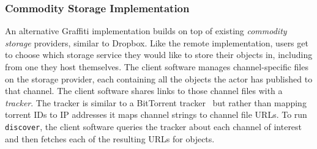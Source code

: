 





\subsubsection{Commodity Storage Implementation}
\label{above-and-below:commodity-storage-protocol}

An alternative Graffiti implementation builds on top of existing
\emph{commodity storage} providers,
similar to Dropbox.
Like the remote implementation, users get to choose which storage
service they would like to store their objects in, including
from one they host themselves.
The client software
manages channel-specific files on the storage provider,
each containing all the objects the actor has published to that channel.
The client software shares links to those channel files with a \emph{tracker}.
The tracker is similar to a BitTorrent tracker~\cite{bittorrent} but
rather than mapping torrent IDs to IP addresses
it maps channel strings to channel file URLs.
To run \texttt{discover}, the client software queries the tracker
about each channel of interest and then fetches each of the resulting URLs for objects.

